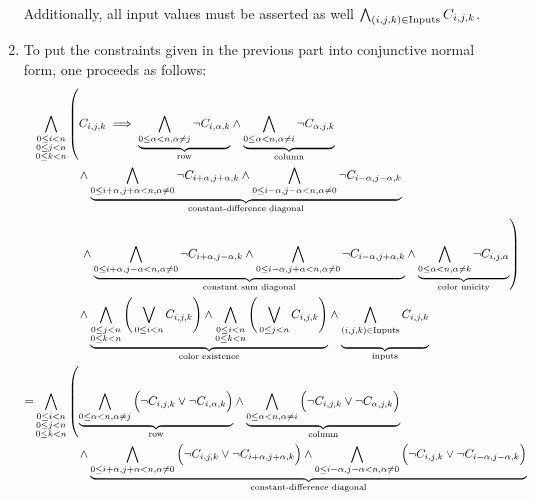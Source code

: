 \documentclass[journal,onecolumn]{IEEEtran}
\begin{document}
\begin{enumerate}
	Additionally, all input values must be asserted as well	\(\bigwedge_{(i, j, k) \in \textnormal{Inputs}} C_{i, j, k}\).
	\item To put the constraints given in the previous part into conjunctive normal form, one proceeds as follows:
	\begin{align*}
	&\bigwedge_{\substack{0 \le i < n \\ 0 \le j < n \\ 0 \le k < n}} \left(C_{i, j, k} \implies {\underbrace{\bigwedge_{0 \le \alpha < n, \alpha \ne j} \lnot C_{i, \alpha, k}}_{\textnormal{row}}} \land {\underbrace{\bigwedge_{0 \le \alpha < n, \alpha \ne i} \lnot C_{\alpha, j, k}}_{\textnormal{column}}}\right. \\
	&\qquad \qquad \! \! {} \land {\underbrace{\bigwedge_{0 \le i+\alpha, j+\alpha < n, \alpha \ne 0} \lnot C_{i+\alpha, j+\alpha, k} \land \bigwedge_{0 \le i-\alpha, j-\alpha < n, \alpha \ne 0} \lnot C_{i-\alpha, j-\alpha, k}}_{\textnormal{constant-difference diagonal}}} \\
	&\left. \qquad \qquad \! \! {} \land {\underbrace{\bigwedge_{0 \le i+\alpha, j-\alpha < n, \alpha \ne 0} \lnot C_{i+\alpha, j-\alpha, k} \land \bigwedge_{0 \le i-\alpha, j+\alpha < n, \alpha \ne 0} \lnot C_{i-\alpha, j+\alpha, k}}_{\textnormal{constant sum diagonal}}} \land {\underbrace{\bigwedge_{0 \le \alpha < n, \alpha \ne k} \lnot C_{i, j, \alpha}}_{\textnormal{color unicity}}} \right) \\
	&\qquad \qquad \! \! {}  \land {\underbrace{\bigwedge_{\substack{0 \le j < n \\ 0 \le k < n}} \Bigg(\bigvee_{0 \le i < n} C_{i, j, k}\Bigg) \land \bigwedge_{\substack{0 \le i < n \\ 0 \le k < n}} \Bigg(\bigvee_{0 \le j < n} C_{i, j, k}\Bigg)}_{\textnormal{color existence}}} \land {\underbrace{\bigwedge_{(i, j, k) \in \textnormal{Inputs}} C_{i, j, k} \vphantom{\bigwedge_{\substack{0 \le j < n \\ 0 \le k < n}}}}_{\textnormal{inputs}}} \\
	=&\bigwedge_{\substack{0 \le i < n \\ 0 \le j < n \\ 0 \le k < n}} \left({\underbrace{\bigwedge_{0 \le \alpha < n, \alpha \ne j} \Big(\lnot C_{i, j, k} \lor \lnot C_{i, \alpha, k} \Big)}_{\textnormal{row}}} \land {\underbrace{\bigwedge_{0 \le \alpha < n, \alpha \ne i} \Big(\lnot C_{i, j, k} \lor \lnot C_{\alpha, j, k}\Big)}_{\textnormal{column}}} \right.\\
	&\qquad \qquad \! \! {}  \land {\underbrace{\bigwedge_{0 \le i+\alpha, j+\alpha < n, \alpha \ne 0} \Big( \lnot C_{i, j, k} \lor \lnot C_{i + \alpha, j+\alpha, k}\Big) \land \bigwedge_{0 \le i-\alpha, j-\alpha < n, \alpha \ne 0} \Big( \lnot C_{i, j, k} \lor \lnot C_{i-\alpha, j-\alpha, k} \Big)}_{\textnormal{constant-difference diagonal}}}\\

\end{align*}
\end{enumerate}
\end{document}
